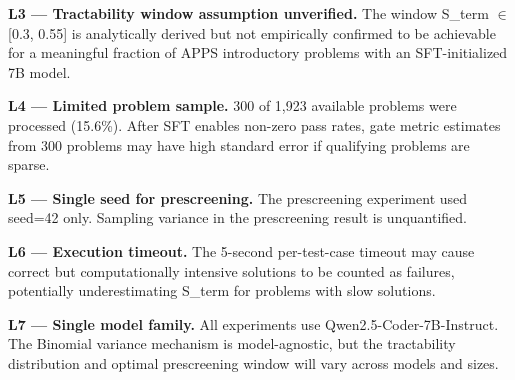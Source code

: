 \textbf{L3 --- Tractability window assumption unverified.} The window S\_term $\in$ [0.3, 0.55] is analytically derived but not empirically confirmed to be achievable for a meaningful fraction of APPS introductory problems with an SFT-initialized 7B model.

\textbf{L4 --- Limited problem sample.} 300 of 1,923 available problems were processed (15.6\%). After SFT enables non-zero pass rates, gate metric estimates from 300 problems may have high standard error if qualifying problems are sparse.

\textbf{L5 --- Single seed for prescreening.} The prescreening experiment used seed=42 only. Sampling variance in the prescreening result is unquantified.

\textbf{L6 --- Execution timeout.} The 5-second per-test-case timeout may cause correct but computationally intensive solutions to be counted as failures, potentially underestimating S\_term for problems with slow solutions.

\textbf{L7 --- Single model family.} All experiments use Qwen2.5-Coder-7B-Instruct. The Binomial variance mechanism is model-agnostic, but the tractability distribution and optimal prescreening window will vary across models and sizes.

